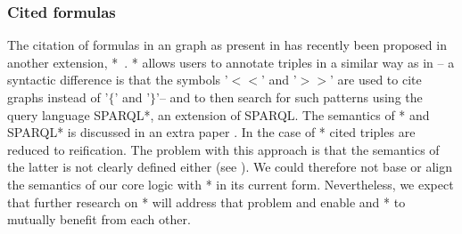 \subsubsection{Cited formulas}
The citation of \rdf formulas in an \rdf graph as present in \nthreelogic has recently been proposed in another \rdf extension, \rdf{}*~\cite{rdfstarposter}. 
\rdf{}* allows users to annotate triples in a similar way as in \nthree -- a syntactic difference is that the symbols '$<<$' and  '$>>$' are 
used to cite graphs instead of '$\{$' and '$\}$'-- and to then search for such patterns using the query language SPARQL*, an extension of SPARQL. 
The semantics of \rdf{}* and SPARQL* is discussed in an extra paper \cite{rdfstar}. In the case of \rdf{}* cited triples are reduced to \rdf reification.  The problem with this approach is that
the semantics of the
latter is not clearly defined either (see \cite[Appendix D]{RDFSemantics}). We could therefore not base or align the semantics of our core logic with \rdf{}* in its current form. 
Nevertheless, we expect that further research on \rdf{}* will address that problem 
and enable \nthreelogic and \rdf{}* to mutually benefit from each other. %

